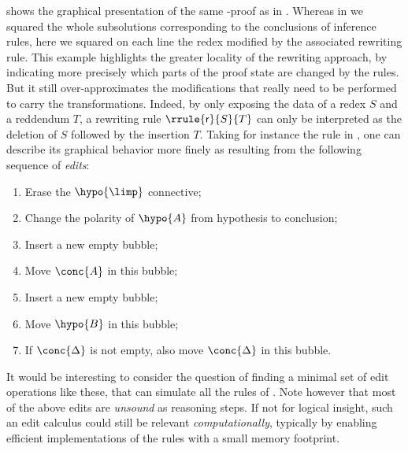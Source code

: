 

 shows the graphical presentation of the same -proof
as in . Whereas in  we squared the whole
subsolutions corresponding to the conclusions of inference rules, here we
squared on each line the redex modified by the associated rewriting rule. This
example highlights the greater locality of the rewriting approach, by indicating
more precisely which parts of the proof state are changed by the rules. But it
still over-approximates the modifications that really need to be performed to
carry the transformations. Indeed, by only exposing the data of a redex $S$ and
a reddendum $T$, a rewriting rule $\rrule{\mathsf{r}}{S}{T}$ can only be
interpreted as the deletion of $S$ followed by the insertion $T$. Taking for
instance the {\rnmsf{{\limp}{-}}} rule in , one can
describe its graphical behavior more finely as resulting from the following
sequence of \emph{edits}:
\begin{enumerate}
  \item Erase the $\hypo{{\limp}}$ connective;
  \item Change the polarity of $\hypo{A}$ from hypothesis to conclusion;
  \item Insert a new empty bubble;
  \item Move $\conc{A}$ in this bubble;
  \item Insert a new empty bubble;
  \item Move $\hypo{B}$ in this bubble;
  \item If $\conc{\Delta}$ is not empty, also move $\conc{\Delta}$ in this bubble.
\end{enumerate}
It would be interesting to consider the question of finding a minimal set of
edit operations like these, that can simulate all the rules of
. Note however that most of the above edits are
\emph{unsound} as reasoning steps. If not for logical insight, such an edit
calculus could still be relevant \emph{computationally}, typically by enabling
efficient implementations of the rules with a small memory footprint.


